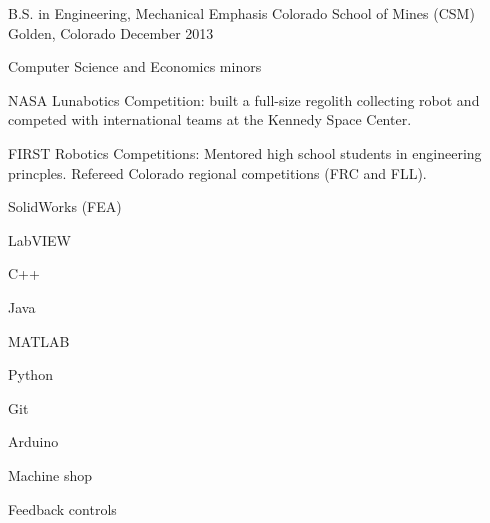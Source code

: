 

\begin{cventries}

  \cventry
    {B.S. in Engineering, Mechanical Emphasis} %
    {Colorado School of Mines (CSM)} %
    {Golden, Colorado} %
    {December 2013} %
    {%
      \begin{cvitems} %
        \item{Computer Science and Economics minors}
        \item{NASA Lunabotics Competition: built a full-size regolith collecting robot and competed with international teams at the Kennedy Space Center.}
        \item{FIRST Robotics Competitions: Mentored high school students in engineering princples. Refereed Colorado regional competitions (FRC and FLL).}
      \end{cvitems}
    }
    \begin{cventryskills}
    \item SolidWorks (FEA)
      \item LabVIEW
      \item C++
      \item Java
      \item MATLAB
      \item Python
      \item Git
      \item Arduino
      \item Machine shop
      \item Feedback controls
    \end{cventryskills}

\end{cventries}
